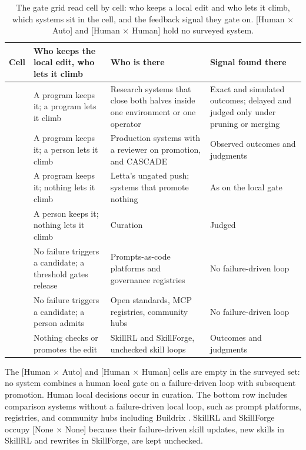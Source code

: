 \begin{table}[h]
\centering\small
\begin{tabular}{>{\raggedright\arraybackslash}p{}>{\raggedright\arraybackslash}p{}>{\raggedright\arraybackslash}p{}>{\raggedright\arraybackslash}p{}}
\toprule
Cell & Who keeps the local edit, who lets it climb & Who is there & Signal found there \\
\midrule
{[Auto $\times$ Auto]} & A program keeps it; a program lets it climb & Research systems that close both halves inside one environment or one operator & Exact and simulated outcomes; delayed and judged only under pruning or merging \\
{[Auto $\times$ Human]} & A program keeps it; a person lets it climb & Production systems with a reviewer on promotion, and CASCADE & Observed outcomes and judgments \\
{[Auto $\times$ None]} & A program keeps it; nothing lets it climb & Letta's ungated push; systems that promote nothing & As on the local gate \\
{[Human $\times$ None]} & A person keeps it; nothing lets it climb & Curation & Judged \\
{[None $\times$ Auto]} & No failure triggers a candidate; a threshold gates release & Prompts-as-code platforms and governance registries & No failure-driven loop \\
{[None $\times$ Human]} & No failure triggers a candidate; a person admits & Open standards, MCP registries, community hubs & No failure-driven loop \\
{[None $\times$ None]} & Nothing checks or promotes the edit & SkillRL and SkillForge, unchecked skill loops & Outcomes and judgments \\
\bottomrule
\end{tabular}
\caption{The gate grid read cell by cell: who keeps a local edit and who lets it climb, which systems sit in the cell, and the feedback signal they gate on. [Human $\times$ Auto] and [Human $\times$ Human] hold no surveyed system.}
\label{tab:gridcells}
\end{table}

The {[}Human \(\times\) Auto{]} and {[}Human \(\times\) Human{]} cells are empty in the surveyed set: no system combines a human local gate on a failure-driven loop with subsequent promotion. Human local decisions occur in curation. The bottom row includes comparison systems without a failure-driven local loop, such as prompt platforms, registries, and community hubs including Buildrix \citep{jiang2026buildrix}. SkillRL and SkillForge occupy {[}None \(\times\) None{]} because their failure-driven skill updates, new skills in SkillRL and rewrites in SkillForge, are kept unchecked.

